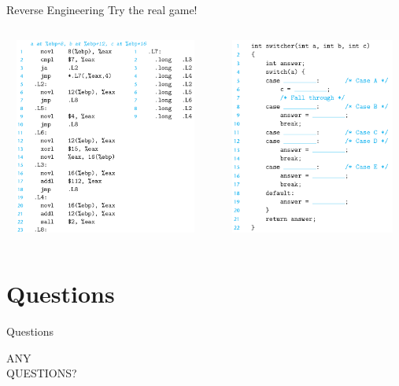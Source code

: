 \documentclass[UKenglish]{beamer}
\begin{document}
\begin{frame}{Reverse Engineering}
  Try the real game!
  \vspace{1cm}
\begin{center}
  \begin{columns}[onlytextwidth]
    \begin{column}{0.45\textwidth}
          \begin{minipage}[c][0.56\textheight][c]{\linewidth} 
          \includegraphics[width = 1\textwidth, height=6.5cm]{switch_assembly.png}
          \end{minipage}
        \end{column}

        \begin{column}{0.45\textwidth}
          \begin{minipage}[c][0.56\textheight][c]{\linewidth} 
          \includegraphics[width = 1\textwidth, height=6.5cm]{switch_c.png}
          \end{minipage}
    \end{column}
  \end{columns}
\end{center}
\end{frame}

\section{Questions}
\begin{frame}{Questions}
  \begin{center}
    \vspace{1.5cm}
    \Huge ANY\\
    \Huge QUESTIONS?\\
  \end{center}
\end{frame}
\end{document}
